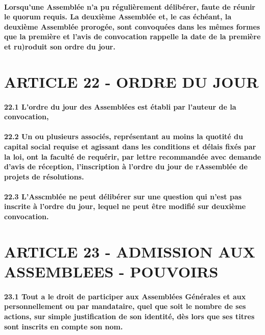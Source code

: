 \documentclass[a4paper, 11pt]{article}
\begin{document}
\paragraph{
  Lorsqu'une Assemblée n'a pu régulièrement délibérer, faute de réunir le quorum requis. La deuxième Assemblée et, le cas échéant, la deuxième Assemblée prorogée, sont convoquées dans les mêmes formes que la première et l'avis de convocation rappelle la date de la première et ru)roduit son ordre du jour.
}

\section*{ARTICLE 22 - ORDRE DU JOUR}

\paragraph{
  22.1 L'ordre du jour des Assemblées est établi par l'auteur de la convocation,
}

\paragraph{
  22.2 Un ou plusieurs associés, représentant au moins la quotité du capital social requise et agissant dans les conditions et délais fixés par la loi, ont la faculté de requérir, par lettre recommandée avec demande d'avis de réception, l'inscription à l'ordre du jour de rAssemblée de projets de résolutions.
}

\paragraph{
  22.3 L'Asscmblée ne peut délibérer sur une question qui n'est pas inscrite à l'ordre du jour, lequel ne peut être modifié sur deuxième convocation.
}

\section*{ARTICLE 23 - ADMISSION AUX ASSEMBLEES - POUVOIRS}

\paragraph{
  23.1 Tout a le droit de participer aux Assemblées Générales et aux personnellement ou par mandataire, quel que soit le nombre de ses actions, sur simple justification de son identité, dès lors que ses titres sont inscrits en compte son nom.
}
\end{document}
